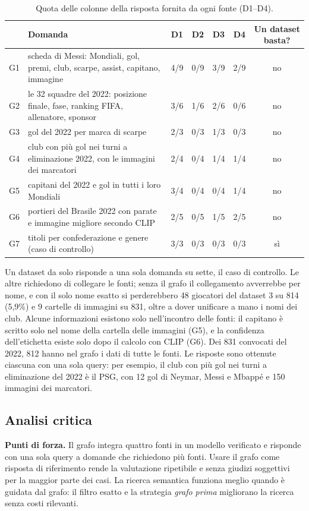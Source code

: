 \documentclass[11pt,a4paper]{article}
\begin{document}
\begin{table}[!htb]
\centering\small
\begin{tabularx}{\textwidth}{@{}l Y c c c c c@{}}
\toprule
& \textbf{Domanda} & \textbf{D1} & \textbf{D2} & \textbf{D3} & \textbf{D4} & \textbf{Un dataset basta?} \\
\midrule
G1 & scheda di Messi: Mondiali, gol, premi, club, scarpe, assist, capitano, immagine & 4/9 & 0/9 & 3/9 & 2/9 & no \\
G2 & le 32 squadre del 2022: posizione finale, fase, ranking FIFA, allenatore, sponsor & 3/6 & 1/6 & 2/6 & 0/6 & no \\
G3 & gol del 2022 per marca di scarpe & 2/3 & 0/3 & 1/3 & 0/3 & no \\
G4 & club con più gol nei turni a eliminazione 2022, con le immagini dei marcatori & 2/4 & 0/4 & 1/4 & 1/4 & no \\
G5 & capitani del 2022 e gol in tutti i loro Mondiali & 3/4 & 0/4 & 0/4 & 1/4 & no \\
G6 & portieri del Brasile 2022 con parate e immagine migliore secondo CLIP & 2/5 & 0/5 & 1/5 & 2/5 & no \\
G7 & titoli per confederazione e genere (caso di controllo) & 3/3 & 0/3 & 0/3 & 0/3 & sì \\
\bottomrule
\end{tabularx}
\caption{Quota delle colonne della risposta fornita da ogni fonte (D1--D4).}
\label{tab:fonti-domande}
\end{table}

Un dataset da solo risponde a una sola domanda su sette, il caso di controllo. Le altre richiedono di collegare le fonti; senza il grafo il collegamento avverrebbe per nome, e con il solo nome esatto si perderebbero 48 giocatori del dataset 3 su 814 (5,9\%) e 9 cartelle di immagini su 831, oltre a dover unificare a mano i nomi dei club. Alcune informazioni esistono solo nell'incontro delle fonti: il capitano è scritto solo nel nome della cartella delle immagini (G5), e la confidenza dell'etichetta esiste solo dopo il calcolo con CLIP (G6). Dei 831 convocati del 2022, 812 hanno nel grafo i dati di tutte le fonti. Le risposte sono ottenute ciascuna con una sola query: per esempio, il club con più gol nei turni a eliminazione del 2022 è il PSG, con 12 gol di Neymar, Messi e Mbappé e 150 immagini dei marcatori.

\subsection{Analisi critica}
\textbf{Punti di forza.} Il grafo integra quattro fonti in un modello verificato e risponde con una sola query a domande che richiedono più fonti. Usare il grafo come risposta di riferimento rende la valutazione ripetibile e senza giudizi soggettivi per la maggior parte dei casi. La ricerca semantica funziona meglio quando è guidata dal grafo: il filtro esatto e la strategia \emph{grafo prima} migliorano la ricerca senza costi rilevanti.
\end{document}
